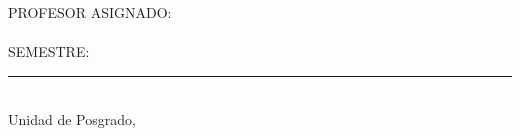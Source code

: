 \begin{titlepage}
{\normalsize PROFESOR ASIGNADO:}\\[0.2cm]
{\normalsize\textbf{\ProfesorAsignado}}\\[0.6cm]

{\normalsize SEMESTRE:}\\[0.2cm]
{\normalsize\textbf{\Semestre}}

\vfill

{\color{ColorPrincipal!40}\noindent\rule{0.7\textwidth}{0.4pt}}\\[0.3cm]
{\footnotesize Unidad de Posgrado, \Facultad}\\[0.1cm]
{\footnotesize \Ciudad \hfill \FechaEntrega}

\end{titlepage}
